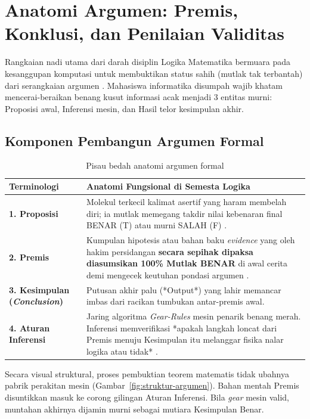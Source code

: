 \section{Anatomi Argumen: Premis, Konklusi, dan Penilaian Validitas}

Rangkaian nadi utama dari darah disiplin Logika Matematika bermuara pada kesanggupan komputasi untuk membuktikan status sahih (mutlak tak terbantah) dari serangkaian argumen \cite{forallx,copi2014}. Mahasiswa informatika disumpah wajib khatam mencerai-beraikan benang kusut informasi acak menjadi 3 entitas murni: Proposisi awal, Inferensi mesin, dan Hasil telor kesimpulan akhir.

\subsection{Komponen Pembangun Argumen Formal}

\begin{table}[htbp]
\centering
\small
\begin{tabular}{|>{\raggedright\arraybackslash}p{2.8cm}|>{\raggedright\arraybackslash}p{9.4cm}|}
\hline
\textbf{Terminologi} & \textbf{Anatomi Fungsional di Semesta Logika} \\
\hline
\textbf{1. Proposisi} & Molekul terkecil kalimat asertif yang haram membelah diri; ia mutlak memegang takdir nilai kebenaran final BENAR (T) atau murni SALAH (F) \cite{rosen2019}. \\
\hline
\textbf{2. Premis} & Kumpulan hipotesis atau bahan baku \textit{evidence} yang oleh hakim persidangan \textbf{secara sepihak dipaksa diasumsikan 100\% Mutlak BENAR} di awal cerita demi mengecek keutuhan pondasi argumen \cite{copi2014}. \\
\hline
\textbf{3. Kesimpulan (\textit{Conclusion})} & Putusan akhir palu (*Output*) yang lahir memancar imbas dari racikan tumbukan antar-premis awal. \\
\hline
\textbf{4. Aturan Inferensi} & Jaring algoritma \textit{Gear-Rules} mesin penarik benang merah. Inferensi memverifikasi *apakah langkah loncat dari Premis menuju Kesimpulan itu melanggar fisika nalar logika atau tidak* \cite{iep_natded}. \\
\hline
\end{tabular}
\caption{Pisau bedah anatomi argumen formal}
\label{tab:konsep-logika}
\end{table}

Secara visual struktural, proses pembuktian teorem matematis tidak ubahnya pabrik perakitan mesin (Gambar~\ref{fig:struktur-argumen}). Bahan mentah Premis disuntikkan masuk ke corong gilingan Aturan Inferensi. Bila \textit{gear} mesin valid, muntahan akhirnya dijamin murni sebagai mutiara Kesimpulan Benar.


